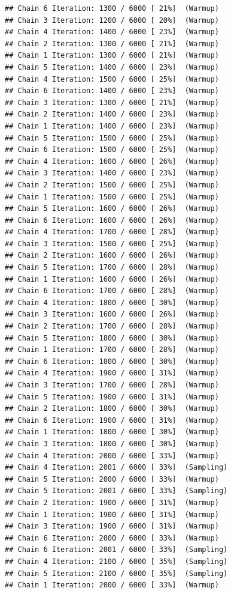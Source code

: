 \documentclass[
]{article}
\begin{document}
\begin{verbatim}
## Chain 6 Iteration: 1300 / 6000 [ 21%]  (Warmup) 
## Chain 3 Iteration: 1200 / 6000 [ 20%]  (Warmup) 
## Chain 4 Iteration: 1400 / 6000 [ 23%]  (Warmup) 
## Chain 2 Iteration: 1300 / 6000 [ 21%]  (Warmup) 
## Chain 1 Iteration: 1300 / 6000 [ 21%]  (Warmup) 
## Chain 5 Iteration: 1400 / 6000 [ 23%]  (Warmup) 
## Chain 4 Iteration: 1500 / 6000 [ 25%]  (Warmup) 
## Chain 6 Iteration: 1400 / 6000 [ 23%]  (Warmup) 
## Chain 3 Iteration: 1300 / 6000 [ 21%]  (Warmup) 
## Chain 2 Iteration: 1400 / 6000 [ 23%]  (Warmup) 
## Chain 1 Iteration: 1400 / 6000 [ 23%]  (Warmup) 
## Chain 5 Iteration: 1500 / 6000 [ 25%]  (Warmup) 
## Chain 6 Iteration: 1500 / 6000 [ 25%]  (Warmup) 
## Chain 4 Iteration: 1600 / 6000 [ 26%]  (Warmup) 
## Chain 3 Iteration: 1400 / 6000 [ 23%]  (Warmup) 
## Chain 2 Iteration: 1500 / 6000 [ 25%]  (Warmup) 
## Chain 1 Iteration: 1500 / 6000 [ 25%]  (Warmup) 
## Chain 5 Iteration: 1600 / 6000 [ 26%]  (Warmup) 
## Chain 6 Iteration: 1600 / 6000 [ 26%]  (Warmup) 
## Chain 4 Iteration: 1700 / 6000 [ 28%]  (Warmup) 
## Chain 3 Iteration: 1500 / 6000 [ 25%]  (Warmup) 
## Chain 2 Iteration: 1600 / 6000 [ 26%]  (Warmup) 
## Chain 5 Iteration: 1700 / 6000 [ 28%]  (Warmup) 
## Chain 1 Iteration: 1600 / 6000 [ 26%]  (Warmup) 
## Chain 6 Iteration: 1700 / 6000 [ 28%]  (Warmup) 
## Chain 4 Iteration: 1800 / 6000 [ 30%]  (Warmup) 
## Chain 3 Iteration: 1600 / 6000 [ 26%]  (Warmup) 
## Chain 2 Iteration: 1700 / 6000 [ 28%]  (Warmup) 
## Chain 5 Iteration: 1800 / 6000 [ 30%]  (Warmup) 
## Chain 1 Iteration: 1700 / 6000 [ 28%]  (Warmup) 
## Chain 6 Iteration: 1800 / 6000 [ 30%]  (Warmup) 
## Chain 4 Iteration: 1900 / 6000 [ 31%]  (Warmup) 
## Chain 3 Iteration: 1700 / 6000 [ 28%]  (Warmup) 
## Chain 5 Iteration: 1900 / 6000 [ 31%]  (Warmup) 
## Chain 2 Iteration: 1800 / 6000 [ 30%]  (Warmup) 
## Chain 6 Iteration: 1900 / 6000 [ 31%]  (Warmup) 
## Chain 1 Iteration: 1800 / 6000 [ 30%]  (Warmup) 
## Chain 3 Iteration: 1800 / 6000 [ 30%]  (Warmup) 
## Chain 4 Iteration: 2000 / 6000 [ 33%]  (Warmup) 
## Chain 4 Iteration: 2001 / 6000 [ 33%]  (Sampling) 
## Chain 5 Iteration: 2000 / 6000 [ 33%]  (Warmup) 
## Chain 5 Iteration: 2001 / 6000 [ 33%]  (Sampling) 
## Chain 2 Iteration: 1900 / 6000 [ 31%]  (Warmup) 
## Chain 1 Iteration: 1900 / 6000 [ 31%]  (Warmup) 
## Chain 3 Iteration: 1900 / 6000 [ 31%]  (Warmup) 
## Chain 6 Iteration: 2000 / 6000 [ 33%]  (Warmup) 
## Chain 6 Iteration: 2001 / 6000 [ 33%]  (Sampling) 
## Chain 4 Iteration: 2100 / 6000 [ 35%]  (Sampling) 
## Chain 5 Iteration: 2100 / 6000 [ 35%]  (Sampling) 
## Chain 1 Iteration: 2000 / 6000 [ 33%]  (Warmup) 

\end{verbatim}
\end{document}
